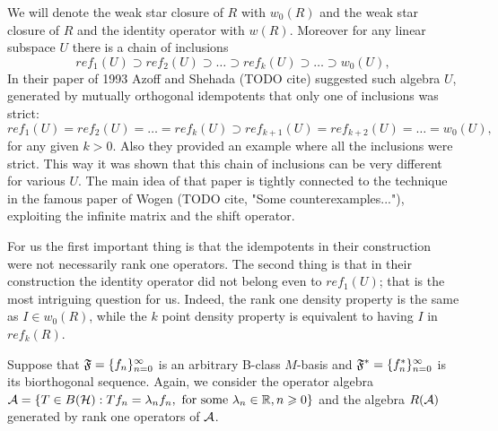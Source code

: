 \documentclass[12pt]{amsart}
\theoremstyle{case}
\begin{document}
  We will denote the weak star closure of $R$ with $w_0(R)$ and the weak star closure of $R$ and the identity operator with $w(R)$.
  Moreover for any linear subspace $U$ there is a chain of inclusions
  \[
    ref_1(U) \supset ref_2(U) \supset \dots \supset ref_k(U) \supset \dots \supset w_0(U),
  \]
  In their paper of 1993 Azoff and Shehada (TODO cite) suggested such algebra $U$, generated by
    mutually orthogonal idempotents that only one of inclusions was strict:
  \[
    ref_1(U) = ref_2(U) = \dots = ref_k(U) \supset ref_{k + 1}(U) = ref_{k+2}(U) = \dots = w_0(U),
  \]
    for any given $k > 0$.
  Also they provided an example where all the inclusions were strict.
  This way it was shown that this chain of inclusions can be very different for various $U$.
  The main idea of that paper is tightly connected to the technique in the famous paper of Wogen (TODO cite, "Some counterexamples..."),
    exploiting the infinite matrix and the shift operator.

  For us the first important thing is that the idempotents in their construction were not necessarily rank one operators.
  The second thing is that in their construction the identity operator did not belong even to $ref_1(U)$;
    that is the most intriguing question for us.
  Indeed, the rank one density property is the same as $I \in w_0(R)$,
    while the $k$ point density property is equivalent to having $I$ in $ref_k(R)$.

  Suppose that $\fsys=\{f_n\}_{n=0}^\infty$ is an arbitrary B-class $M$-basis and
    $\fstarsys = \{f^*_n\}_{n=0}^\infty$ is its biorthogonal sequence.
  Again, we consider the operator algebra $\cal{A} = \{T\in B(\cal{H}): Tf_n = \lambda_n f_n,
    \text{ for some } \lambda_n \in \mathbb{R}, n \geq 0\}$
    and the algebra $R(\cal{A})$ generated by rank one operators of $\cal{A}$.
\end{document}
